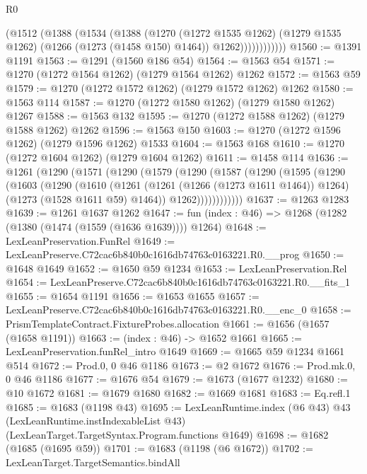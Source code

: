 \begin{lexlean}{R0}
\begin{coremodule}
                  (@1512
                    (@1388
                      (@1534
                        (@1388
                          (@1270
                            (@1272 @1535 @1262)
                            (@1279 @1535 @1262)
                            (@1266 (@1273 (@1458 @150) @1464))
                            @1262))))))))))))
@1560 := @1391 @1191
@1563 := @1291 (@1560 @186 @54)
@1564 := @1563 @54
@1571 := @1270 (@1272 @1564 @1262) (@1279 @1564 @1262) @1262
@1572 := @1563 @59
@1579 := @1270 (@1272 @1572 @1262) (@1279 @1572 @1262) @1262
@1580 := @1563 @114
@1587 := @1270 (@1272 @1580 @1262) (@1279 @1580 @1262) @1267
@1588 := @1563 @132
@1595 := @1270 (@1272 @1588 @1262) (@1279 @1588 @1262) @1262
@1596 := @1563 @150
@1603 := @1270 (@1272 @1596 @1262) (@1279 @1596 @1262) @1533
@1604 := @1563 @168
@1610 := @1270 (@1272 @1604 @1262) (@1279 @1604 @1262)
@1611 := @1458 @114
@1636 := @1261
    (@1290
      (@1571
        (@1290
          (@1579
            (@1290
              (@1587
                (@1290
                  (@1595
                    (@1290
                      (@1603
                        (@1290
                          (@1610
                            (@1261
                              (@1261 (@1266 (@1273 @1611 @1464)) @1264)
                              (@1273 (@1528 @1611 @59) @1464))
                            @1262))))))))))))
@1637 := @1263 @1283
@1639 := @1261 @1637 @1262
@1647 := fun (index : @46) => @1268 (@1282 (@1380 (@1474 (@1559 (@1636 @1639)))) @1264)
@1648 := LexLeanPreservation.FunRel
@1649 := LexLeanPreserve.C72cac6b840b0c1616db74763c0163221.R0.__prog
@1650 := @1648 @1649
@1652 := @1650 @59 @1234
@1653 := LexLeanPreservation.Rel
@1654 := LexLeanPreserve.C72cac6b840b0c1616db74763c0163221.R0.__fits_1
@1655 := @1654 @1191
@1656 := @1653 @1655
@1657 := LexLeanPreserve.C72cac6b840b0c1616db74763c0163221.R0.__enc_0
@1658 := PrismTemplateContract.FixtureProbes.allocation
@1661 := @1656 (@1657 (@1658 @1191))
@1663 := (index : @46) -> @1652 @1661
@1665 := LexLeanPreservation.funRel_intro @1649
@1669 := @1665 @59 @1234 @1661 @514
@1672 := Prod.{0, 0} @46 @1186
@1673 := @2 @1672
@1676 := Prod.mk.{0, 0} @46 @1186
@1677 := @1676 @54
@1679 := @1673 (@1677 @1232)
@1680 := @10 @1672
@1681 := @1679 @1680
@1682 := @1669 @1681
@1683 := Eq.refl.{1}
@1685 := @1683 (@1198 @43)
@1695 := LexLeanRuntime.index
    (@6 @43)
    @43
    (LexLeanRuntime.instIndexableList @43)
    (LexLeanTarget.TargetSyntax.Program.functions @1649)
@1698 := @1682 (@1685 (@1695 @59))
@1701 := @1683 (@1198 (@6 @1672))
@1702 := LexLeanTarget.TargetSemantics.bindAll

\end{coremodule}
\end{lexlean}
